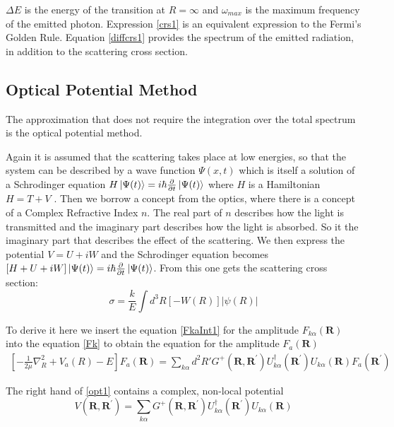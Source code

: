 $ \Delta E $ is the energy of the transition at $ R = \infty $ and $ \omega_{max} $ is the maximum frequency of the emitted photon. Expression \eqref{crs1} is an equivalent expression to the Fermi's Golden Rule. Equation \eqref{diffcrs1} provides the spectrum of the emitted radiation, in addition to the scattering cross section. 

\subsection{Optical Potential Method}

The approximation that does not require the integration over the total spectrum is the optical potential method. 

Again it is assumed that the scattering takes place at low energies, so that the system can be described by a wave function $ \Psi(x,t) $ which is itself a solution of a Schrodinger equation $ H\ket{\Psi(t)} = i\hbar\frac{\partial}{\partial t}\ket{\Psi(t)} $ where $ H $ is a Hamiltonian $ H = T + V $ .
Then we borrow a concept from the optics, where there is a concept of a Complex Refractive Index $ n $. The real part of $ n $ describes how the light is transmitted and the imaginary part describes how the light is absorbed. So it the imaginary part that describes the effect of the scattering. We then express the potential $ V = U + iW $  and the Schrodinger equation becomes $ \left[H + U + iW\right]\ket{\Psi(t)} = i\hbar\frac{\partial}{\partial t}\ket{\Psi(t)} $. From this one gets the scattering cross section:
\begin{equation}
\sigma = \frac{k}{E}\int{d^3R\left[-W(R)\right]\left| \psi(R) \right|}
\end{equation}

To derive it here we insert the equation \eqref{FkaInt1} for the amplitude $ F_{k\alpha}(\mathbf{R}) $ into the equation \eqref{Fk} to obtain the equation for the amplitude $ F_a(\mathbf{R}) $
\begin{equation}\label{opt1}
\begin{split}
\left[-\frac{1}{2\mu}\nabla_R^2 + V_a(R) - E \right]F_a(\mathbf{R}) = \sum_{k\alpha}{d^2R'G^{+}(\mathbf{R},\mathbf{R}^{'})U_{k\alpha}^{\dagger}(\mathbf{R}^{'})U_{k\alpha}(\mathbf{R})F_a(\mathbf{R}^{'})}
\end{split}
\end{equation}

The right hand of \eqref{opt1} contains a complex, non-local potential
\begin{equation}\label{optV1}
V(\mathbf{R},\mathbf{R}^{'}) = \sum_{k\alpha}{G^{+}(\mathbf{R},\mathbf{R}^{'})U_{k\alpha}^{\dagger}(\mathbf{R}^{'})U_{k\alpha}(\mathbf{R}) }
\end{equation}

